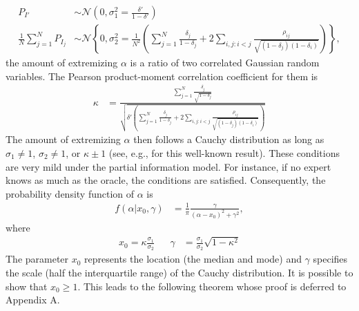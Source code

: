 \documentclass[11pt]{article}
\theoremstyle{definition}
\theoremstyle{definition}
\begin{document}
\begin{align*}
P_{I'} &\sim \mathcal{N}\left(0, \sigma^2_{1} = \frac{\delta'}{1-\delta'} \right)\\
\frac{1}{N}\sum_{j=1}^N P_{I_j} &\sim \mathcal{N}\left\{0, \sigma^2_{2} =\frac{1}{N^2} \left( \sum_{j=1}^N \frac{\delta_j}{1-\delta_j} + 2 \sum_{i,j: i<j} \frac{\rho_{ij}}{\sqrt{(1-\delta_j)(1-\delta_i)}}\right) \right\},
\end{align*}
the amount of extremizing $\alpha$ is a ratio of two correlated Gaussian random variables. The Pearson product-moment correlation coefficient for them is
\begin{align*}
\kappa  &= \frac{ \sum_{j=1}^N \frac{\delta_j}{\sqrt{1-\delta_j}}}{\sqrt{\delta'  \left( \sum_{j=1}^N \frac{\delta_j}{1-\delta_j} + 2 \sum_{i,j: i<j} \frac{\rho_{ij}}{\sqrt{(1-\delta_j)(1-\delta_i)}}\right)}}
\end{align*}
The amount of extremizing $\alpha$ then follows a Cauchy distribution as long as $\sigma_1 \neq 1$, $\sigma_2 \neq 1$, or $\kappa \pm 1$ (see, e.g., \cite{cedilnik2004distribution} for this well-known result). These conditions are very mild under the partial information model. For instance, if no expert knows as much as the oracle, the conditions are satisfied. Consequently, the probability density function of $\alpha$ is
\begin{align}
f(\alpha | x_0, \gamma) &= \frac{1}{\pi} \frac{\gamma}{(\alpha-x_0)^2+\gamma^2}, \label{Cauchy}
\end{align}
where 
\begin{align*}
x_0 = \kappa \frac{\sigma_1}{\sigma_2} && \gamma &= \frac{\sigma_1}{\sigma_2} \sqrt{1-\kappa^2}
\end{align*}
The parameter $x_0$ represents the location (the median and mode) and $\gamma$ specifies the scale (half the interquartile range) of the Cauchy distribution. It is possible to show that $x_0 \geq 1$. This leads to the following theorem whose proof is deferred to Appendix A.
\end{document}
